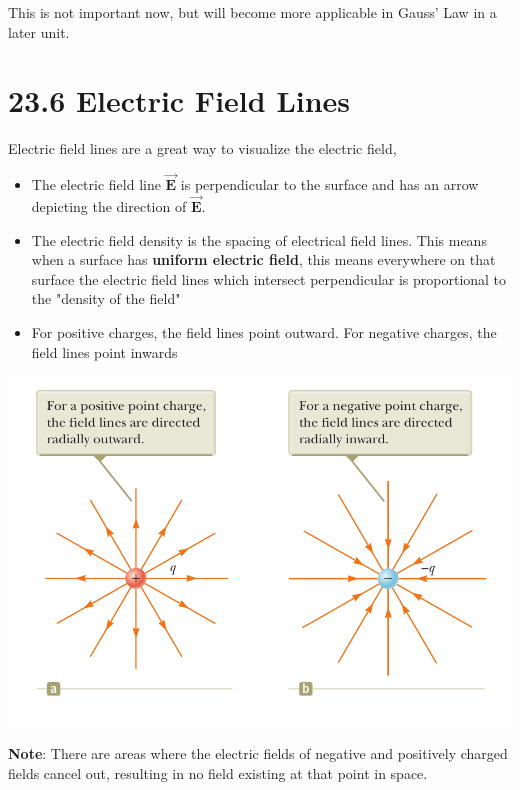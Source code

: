\documentclass[12pt, titlepage, oneside]{article}
\let\oldvec\vec
\renewcommand{\vec}[1]{\oldvec{\bm{#1}}}
\begin{document}
	This is not important now, but will become more applicable in Gauss' Law in a later unit.
	\section*{23.6 Electric Field Lines}
	
	Electric field lines are a great way to visualize the electric field,
	
	\begin{itemize}
	\item The electric field line $\vec{E}$ is perpendicular to the surface and has an arrow depicting the direction of $\vec{E}$.	
	\item The electric field density is the spacing of electrical field lines. This means when a surface has \textbf{uniform electric field}, this means everywhere on that surface the electric field lines which intersect perpendicular is proportional to the "density of the field"
	\item For positive charges, the field lines point outward. For negative charges, the field lines point inwards
\end{itemize}
\begin{center}
\includegraphics[scale=0.32]{2.png}
\end{center}
\textbf{Note}: There are areas where the electric fields of negative and positively charged fields cancel out, resulting in no field existing at that point in space. 
\end{document}
